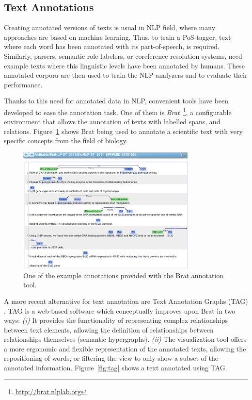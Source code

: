 \subsection{Text Annotations}
\label{sec:background_anns}

Creating annotated versions of texts is usual in NLP field, where many
approaches are based on machine learning. Thus, to train a PoS-tagger, text
where each word has been annotated with its part-of-speech, is required.
Similarly, parsers, semantic role labelers, or coreference resolution systems,
need example texts where this linguistic levels have been annotated by humans.
These annotated corpora are then used to train the NLP analyzers and to
evaluate their performance.

Thanks to this need for annotated data in NLP, convenient tools have been
developed to ease the annotation task. One of them is
\emph{Brat}~\cite{stenetorp2012brat}\footnote{\url{http://brat.nlplab.org}}, a
configurable environment that allows the annotation of texts with labelled
spans, and relations. Figure~\ref{fig:brat} shows Brat being used to annotate a
scientific text with very specific concepts from the field of biology.


\begin{figure}[htb]
  \centering
  \includegraphics[width=0.8\textwidth]{figures/brat}
  \caption{One of the example annotations provided with the Brat
    annotation tool.}
  \label{fig:brat}
\end{figure}

A more recent alternative for text annotation are Text Annotation Graphs (TAG)
\cite{DBLP:journals/corr/abs-1711-00529}. TAG is a web-based software which
conceptually improves upon Brat in two ways: \textit{(i)} It provides the
functionality of representing complex relationships between text elements,
allowing the definition of relationships between relationships themselves
(semantic hypergraphs). \textit{(ii)} The visualization tool offers a more
ergonomic and flexible representation of the annotated texts, allowing the
repositioning of words, or filtering the view to only show a subset of the
annotated information. Figure~\ref{fig:tag} shows a text annotated using TAG.

